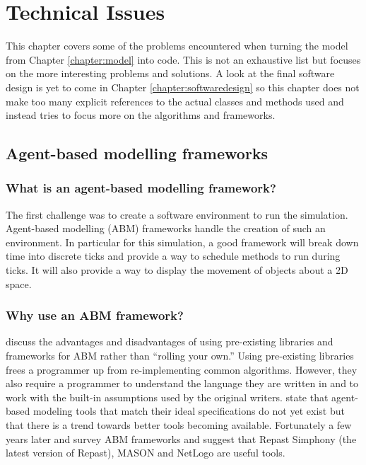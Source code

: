 \chapter{Technical Issues}\label{chapter:technicalissues}
This chapter covers some of the problems encountered when turning the model from Chapter \ref{chapter:model} into code. This is not an exhaustive list but focuses on the more interesting problems and solutions. A look at the final software design is yet to come in Chapter \ref{chapter:softwaredesign} so this chapter does not make too many explicit references to the actual classes and methods used and instead tries to focus more on the algorithms and frameworks.

  \section{Agent-based modelling frameworks}
    \subsection{What is an agent-based modelling framework?}
    The first challenge was to create a software environment to run the simulation. Agent-based modelling (ABM) frameworks handle the creation of such an environment. In particular for this simulation, a good framework will break down time into discrete ticks and provide a way to schedule methods to run during ticks. It will also provide a way to display the movement of objects about a 2D space.
    
    \subsection{Why use an ABM framework?}
    \textcite{Gilbert2002} discuss the advantages and
    disadvantages of using pre-existing libraries and frameworks for ABM rather
    than ``rolling your own.'' Using pre-existing libraries frees a
    programmer up from re-implementing common
    algorithms. However, they also require a programmer to understand the
    language they are written in and to work with the built-in
    assumptions used by the original writers. \textcite{Gilbert2002} state
    that agent-based modeling tools that match their ideal specifications
    do not yet exist but that there is a trend towards better
    tools becoming available. Fortunately a few years later \textcite{Allan2009} and \textcite{Berryman2008} survey ABM frameworks and suggest that Repast Simphony (the latest version of Repast), MASON and NetLogo are useful tools.
    
